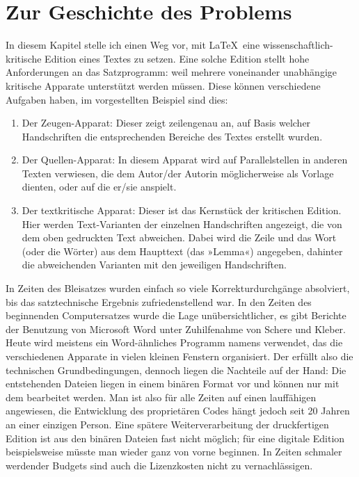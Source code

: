 \VerbatimFootnotes
\DefineShortVerb{\+}

\section{Zur Geschichte des Problems}

In diesem Kapitel stelle ich einen Weg vor, mit \LaTeX\ eine wissenschaftlich-kritische Edition eines Textes zu setzen. Eine solche Edition stellt hohe Anforderungen an das Satzprogramm: weil mehrere voneinander unabhängige kritische Apparate unterstützt werden müssen. Diese können verschiedene Aufgaben haben, im vorgestellten Beispiel sind dies:

\begin{enumerate}\label{pil:apparat}
\item Der Zeugen-Apparat: Dieser zeigt zeilengenau an, auf Basis welcher Handschriften die entsprechenden Bereiche des Textes erstellt wurden.

\item Der Quellen-Apparat: In diesem Apparat wird auf Parallelstellen in anderen Texten verwiesen, die dem Autor/der Autorin 
möglicherweise als Vorlage dienten, oder auf die er/sie anspielt.

\item Der textkritische Apparat: Dieser ist das Kernstück der kritischen Edition. Hier werden Text-Varianten der einzelnen Handschriften angezeigt, die von dem oben gedruckten Text 
abweichen. 
Dabei wird die Zeile und das 
Wort (oder die Wörter) aus dem Haupttext (das »Lemma«) angegeben, dahinter die 
abweichenden Varianten mit den jeweiligen Handschriften.
\end{enumerate}

In Zeiten des Bleisatzes wurden einfach so viele Korrekturdurchgänge absolviert, 
bis das satztechnische Ergebnis zufriedenstellend war. In den Zeiten des beginnenden 
Computersatzes wurde die Lage unübersichtlicher, es gibt Berichte der 
Benutzung von Microsoft Word unter 
Zuhilfenahme von Schere und Kleber.~\cite[34]{stockhausen:mde2016/2} Heute wird meistens 
ein Word-ähnliches Programm namens  verwendet, 
das die verschiedenen Apparate in vielen kleinen Fenstern organisiert. 
Der  erfüllt also die technischen Grundbedingungen, dennoch liegen die 
Nachteile auf der Hand: Die entstehenden Dateien liegen in einem binären Format 
vor und können nur mit dem  bearbeitet werden. 
Man ist also für alle Zeiten auf einen lauffähigen  angewiesen, 
die Entwicklung des proprietären Codes hängt jedoch seit 20 Jahren an einer einzigen Person.
Eine spätere Weiterverarbeitung der druckfertigen Edition ist aus den binären Dateien 
fast nicht möglich; für eine digitale Edition beispielsweise müsste man wieder ganz von vorne beginnen.
In Zeiten schmaler werdender Budgets sind auch die Lizenzkosten nicht zu vernachlässigen.

